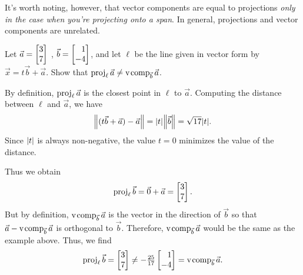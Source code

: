 It's worth noting, however, that vector components are equal to projections \emph{only in the case when you're
projecting onto a span}. In general, projections and vector components are unrelated. 

\begin{example}
	Let $\vec a=\mat{3\\7}$ , $\vec b=\mat{1\\-4}$, and let $\ell$ be the line given in vector form by
	$\vec x=t\vec b+\vec a$. Show that $\operatorname{proj}_\ell\vec a\neq \operatorname{v\hspace{1pt}comp}_{\vec b}\vec a$.

	By definition, $\operatorname{proj}_{\ell}\vec a$ is the closest point in $\ell$ to $\vec a$. Computing the distance between $\ell$ and $\vec a$, we have
	\[
	    \norm*{(t\vec b+\vec a)-\vec a}=\Abs{t}\norm*{\vec b}=\sqrt{17}\Abs{t}.
	\]
	Since $\lvert t\rvert$ is always non-negative, the value $t=0$ minimizes the value of the distance. 
	
	Thus we obtain
	\[
	    \Proj_{\ell}\vec b = \vec 0 + \vec a = \mat{3\\7}.
	\]
	But by definition, $\operatorname{v\hspace{1pt}comp}_{\vec b}\vec a$ is the vector in the direction of $\vec b$ so that $\vec a - \operatorname{v\hspace{1pt}comp}_{\vec b}\vec a$ is orthogonal to $\vec b$. Therefore, $\operatorname{v\hspace{1pt}comp}_{\vec b}\vec a$ would be the same as the example above. Thus, we find 
	\[
	    \Proj_{\ell}\vec b=\mat{3\\7}\neq-\tfrac{25}{17}\mat{1\\-4}=\Vcomp_{\vec b}\vec a.
	\]
	
\end{example}
